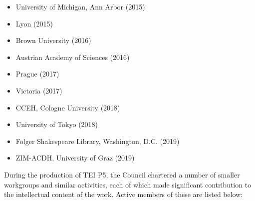 \begin{itemize}
\item University of Michigan, Ann Arbor (2015)
\item Lyon (2015)
\item Brown University (2016)
\item Austrian Academy of Sciences (2016)
\item Prague (2017)
\item Victoria (2017)
\item CCEH, Cologne University (2018)
\item University of Tokyo (2018)
\item Folger Shakespeare Library, Washington, D.C. (2019)
\item ZIM-ACDH, University of Graz (2019)
\end{itemize} \par
During the production of TEI P5, the Council chartered a number of smaller workgroups and similar activities, each of which made significant contribution to the intellectual content of the work. Active members of these are listed below: \begin{description}


\end{description}
